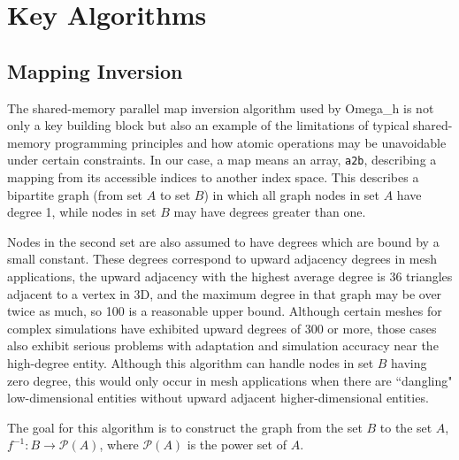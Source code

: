 
\appendix    %

\chapter{Key Algorithms}

\section{Mapping Inversion}
\label{sec:invert_map}

The shared-memory parallel map inversion algorithm used by
Omega\_h is not only a key building block but also an example
of the limitations of typical shared-memory programming principles
and how atomic operations may be unavoidable under certain constraints.
In our case, a map means an array, \texttt{a2b}, describing a mapping from
its accessible indices to another index space.
This describes a bipartite graph (from set $A$ to set $B$) in which all graph nodes
in set $A$ have degree 1, while nodes in set $B$ may
have degrees greater than one.

Nodes in the second set are also assumed to have degrees
which are bound by a small constant.
These degrees correspond to upward adjacency degrees in mesh
applications, the upward adjacency with the highest average degree is 36
triangles adjacent to a vertex in 3D, and the maximum degree in that
graph may be over twice as much, so 100 is a reasonable upper bound.
Although certain meshes for complex simulations have exhibited upward degrees
of 300 or more, those cases also exhibit serious problems with adaptation
and simulation accuracy near the high-degree entity.
Although this algorithm can handle nodes in set $B$ having zero degree,
this would only occur in mesh applications when there are ``dangling"
low-dimensional entities without upward adjacent higher-dimensional entities.

The goal for this algorithm is to construct the graph from the set $B$ to the set $A$,
$f^{-1}:B\to \mathcal{P}(A)$, where $\mathcal{P}(A)$ is the power set of $A$.

